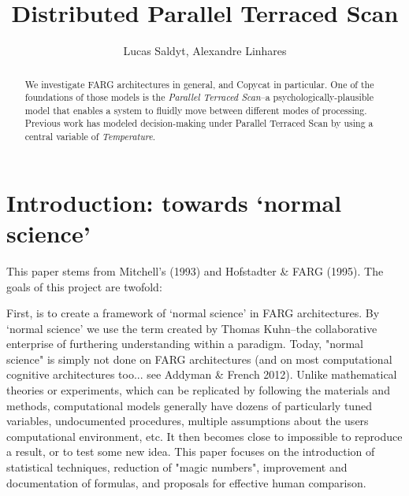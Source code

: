 \documentclass[a4paper]{article}
\title{Distributed Parallel Terraced Scan}
\author{Lucas Saldyt, Alexandre Linhares}
\begin{document}
\maketitle

\begin{abstract}
We investigate FARG architectures in general, and Copycat in particular.  One of the foundations of those models is the \emph{Parallel Terraced Scan}--a psychologically-plausible model that enables a system to fluidly move between different modes of processing.  Previous work has modeled decision-making under Parallel Terraced Scan by using a central variable of \emph{Temperature}. 

\end{abstract}

\section{Introduction: towards `normal science'}

This paper stems from Mitchell's (1993) and Hofstadter \& FARG (1995). The goals of this project are twofold:

 	First, is to create a framework of  `normal science' in FARG architectures. 
    By `normal science' we use the term created by Thomas Kuhn--the collaborative enterprise of furthering understanding within a paradigm. 
    Today, "normal science" is simply not done on FARG architectures (and on most computational cognitive architectures too... see Addyman \& French 2012). 
    Unlike mathematical theories or experiments, which can be replicated by following the materials and methods, computational models generally have dozens of particularly tuned variables, undocumented procedures, multiple assumptions about the users computational environment, etc. 
    It then becomes close to impossible to reproduce a result, or to test some new idea. 
    This paper focuses on the introduction of statistical techniques, reduction of "magic numbers", improvement and documentation of formulas, and proposals for effective human comparison.
\end{document}
